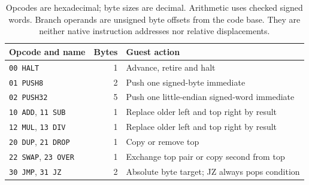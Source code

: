 \begin{table}[htbp]
  \centering
  \begin{tabular}{l r l}
    \toprule
    Opcode and name                    & Bytes & Guest action                                   \\
    \midrule
    \texttt{00 HALT}                   & 1     & Advance, retire and halt                       \\
    \texttt{01 PUSH8}                  & 2     & Push one signed-byte immediate                 \\
    \texttt{02 PUSH32}                 & 5     & Push one little-endian signed-word immediate   \\
    \texttt{10 ADD}, \texttt{11 SUB}   & 1     & Replace older left and top right by result     \\
    \texttt{12 MUL}, \texttt{13 DIV}   & 1     & Replace older left and top right by result     \\
    \texttt{20 DUP}, \texttt{21 DROP}  & 1     & Copy or remove top                             \\
    \texttt{22 SWAP}, \texttt{23 OVER} & 1     & Exchange top pair or copy second from top      \\
    \texttt{30 JMP}, \texttt{31 JZ}    & 2     & Absolute byte target; JZ always pops condition \\
    \bottomrule
  \end{tabular}
  \caption{Opcodes are hexadecimal; byte sizes are decimal. Arithmetic uses checked signed words. Branch operands are unsigned byte offsets from the code base. They are neither native instruction addresses nor relative displacements.}
  \label{tab:revision-bytecode-encoding}
\end{table}
